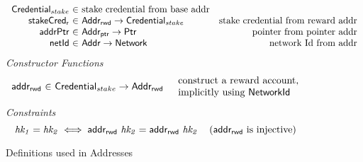 \begin{figure*}[hbt]
\begin{equation*}
\begin{array}{r@{~\in~}lr}
                          \StakeCredential & \text{stake credential from base
                                      addr}\\
      \fun{stakeCred_{r}} & \AddrRWD \to \StakeCredential & \text{stake credential
                                                   from reward addr}\\
      \fun{addrPtr} & \AddrP \to \Ptr
                    & \text{pointer from pointer addr}\\
      \fun{netId} & \Addr \to \Network
                    & \text{network Id from addr}\\
    \end{array}
  \end{equation*}
  \emph{Constructor Functions}
  \begin{equation*}
    \begin{array}{r@{~\in~}lr}
      \fun{addr_{rwd}}
        & \Credential_{stake} \to \AddrRWD
        & \begin{array}{l}
            \text{construct a reward account,} \\
            \text{implicitly using $\NetworkId$}
          \end{array}
    \end{array}
  \end{equation*}
  \emph{Constraints}
  \begin{equation*}
    \mathit{hk_1} = \mathit{hk_2} \iff \mathsf{addr_{rwd}}~\mathit{hk_2} = \mathsf{addr_{rwd}}~\mathit{hk_2}
    ~~~ \left( \mathsf{addr_{rwd}} \text{ is injective} \right)
  \end{equation*}
  \caption{Definitions used in Addresses}
  \label{fig:defs:addresses}
\end{figure*}

\clearpage
